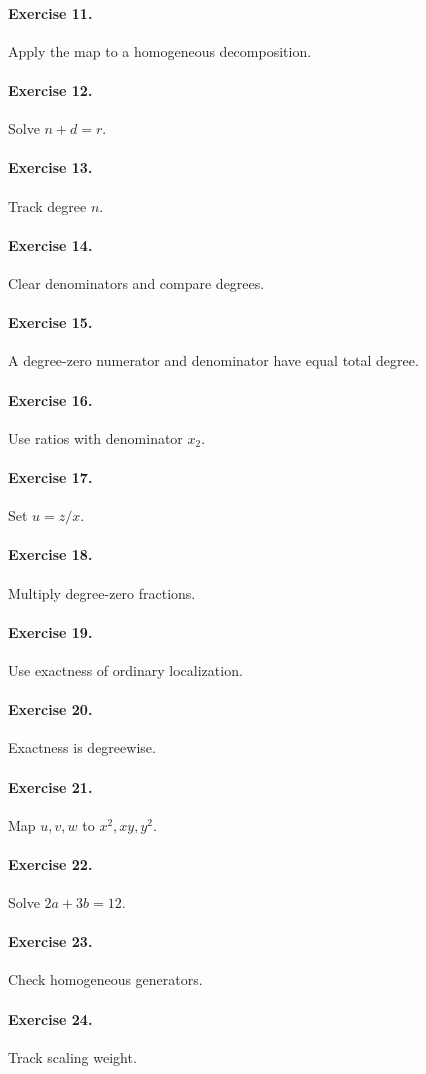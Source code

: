 \paragraph{Exercise 11.} Apply the map to a homogeneous decomposition.

\paragraph{Exercise 12.} Solve \(n+d=r\).

\paragraph{Exercise 13.} Track degree \(n\).

\paragraph{Exercise 14.} Clear denominators and compare degrees.

\paragraph{Exercise 15.} A degree-zero numerator and denominator have equal total degree.

\paragraph{Exercise 16.} Use ratios with denominator \(x_2\).

\paragraph{Exercise 17.} Set \(u=z/x\).

\paragraph{Exercise 18.} Multiply degree-zero fractions.

\paragraph{Exercise 19.} Use exactness of ordinary localization.

\paragraph{Exercise 20.} Exactness is degreewise.

\paragraph{Exercise 21.} Map \(u,v,w\) to \(x^2,xy,y^2\).

\paragraph{Exercise 22.} Solve \(2a+3b=12\).

\paragraph{Exercise 23.} Check homogeneous generators.

\paragraph{Exercise 24.} Track scaling weight.

